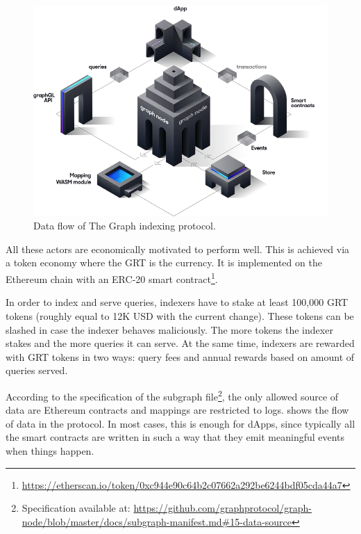 \begin{figure}[!ht]
  \centering
  \includegraphics[width=1\textwidth]{Figures/graph-dataflow.png}
  \caption[The Graph data flow]{Data flow of The Graph indexing protocol\protect\footnotemark.}
  \label{fig:the-graph-data-flow}
\end{figure}


All these actors are economically motivated to perform well. This is achieved via a token economy where the GRT is the currency. It is implemented on the Ethereum chain with an ERC-20 smart contract\footnote{\url{https://etherscan.io/token/0xc944e90c64b2c07662a292be6244bdf05cda44a7}}.

In order to index and serve queries, indexers have to stake at least 100,000 GRT tokens (roughly equal to 12K USD with the current change). These tokens can be slashed in case the indexer behaves maliciously. The more tokens the indexer stakes and the more queries it can serve. At the same time, indexers are rewarded with GRT tokens in two ways: query fees and annual rewards based on amount of queries served.

According to the specification of the subgraph file\footnote{Specification available at: \url{https://github.com/graphprotocol/graph-node/blob/master/docs/subgraph-manifest.md\#15-data-source}}, the only allowed source of data are Ethereum contracts and mappings are restricted to logs.  shows the flow of data in the protocol. In most cases, this is enough for dApps, since typically all the smart contracts are written in such a way that they emit meaningful events when things happen. 

